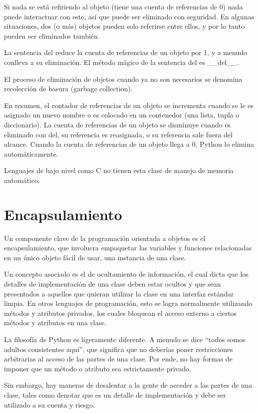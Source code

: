 \documentclass{report}
\newcommand{\doble}[1]{``#1''}
\begin{document}
Si nada se está refiriendo al objeto (tiene una cuenta de referencias de 0) nada puede interactuar con este, así que puede ser eliminado con seguridad.
En algunas situaciones, dos (o más) objetos pueden solo referirse entre ellos, y por lo tanto pueden ser eliminados también.

La sentencia del reduce la cuenta de referencias de un objeto por 1, y a menudo conlleva a su eliminación. El método mágico de la sentencia del es \_\_del\_\_.

El proceso de eliminación de objetos cuando ya no son necesarios se denomina recolección de basura (garbage collection).

En resumen, el contador de referencias de un objeto se incrementa cuando se le es asignado un nuevo nombre o es colocado en un contenedor (una lista, tupla o diccionario). La cuenta de referencias de un objeto se disminuye cuando es eliminado con del, su referencia es reasignada, o su referencia sale fuera del alcance. Cuando la cuenta de referencias de un objeto llega a 0, Python lo elimina automáticamente.


Lenguajes de bajo nivel como C no tienen esta clase de manejo de memoria automático.

\section{Encapsulamiento}

Un componente clave de la programación orientada a objetos es el encapsulamiento, que involucra empaquetar las variables y funciones relacionadas en un único objeto fácil de usar, una instancia de una clase.

Un concepto asociado es el de ocultamiento de información, el cual dicta que los detalles de implementación de una clase deben estar ocultos y que sean presentados a aquellos que quieran utilizar la clase en una interfaz estándar limpia. En otros lenguajes de programación, esto se logra normalmente utilizando métodos y atributos privados, los cuales bloquean el acceso externo a ciertos métodos y atributos en una clase.

La filosofía de Python es ligeramente diferente. A menudo se dice \doble{todos somos adultos consistentes aquí}, que significa que no deberías poner restricciones arbitrarias al acceso de las partes de una clase. Por ende, no hay formas de imponer que un método o atributo sea estrictamente privado.

Sin embargo, hay maneras de desalentar a la gente de acceder a las partes de una clase, tales como denotar que es un detalle de implementación y debe ser utilizado a su cuenta y riesgo.
\end{document}
